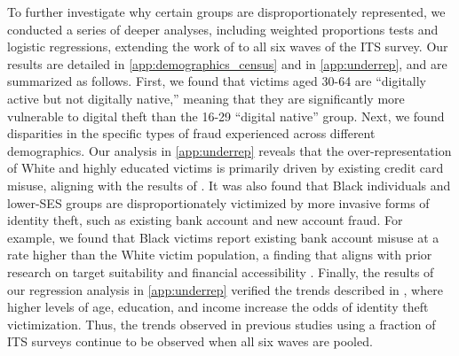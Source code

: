To further investigate why certain groups are disproportionately represented, we conducted a series of deeper analyses, including weighted proportions tests and logistic regressions, extending the work of \cite{Reynolds2021Differential, DeLiema2021} to all six waves of the ITS survey. Our results are detailed in \ref{app:demographics_census} and in \ref{app:underrep}, and are summarized as follows. First, we found that victims aged 30-64 are ``digitally active but not digitally native,'' meaning that they are significantly more vulnerable to digital theft than the 16-29 ``digital native'' group. Next, we found disparities in the specific types of fraud experienced across different demographics. Our analysis in \ref{app:underrep} reveals that the over-representation of White and highly educated victims is primarily driven by existing credit card misuse, aligning with the results of \cite{Nevin2025, Copes2010}. It was also found that Black individuals and lower-SES groups are disproportionately victimized by more invasive forms of identity theft, such as existing bank account and new account fraud. For example, we found that Black victims report existing bank account misuse at a rate higher than the White victim population, a finding that aligns with prior research on target suitability and financial accessibility \cite{Copes2010}. Finally, the results of our regression analysis in \ref{app:underrep} verified the trends described in \cite{Reynolds2021Differential}, where higher levels of age, education, and income increase the odds of identity theft victimization. Thus, the trends observed in previous studies using a fraction of ITS surveys continue to be observed when all six waves are pooled.

